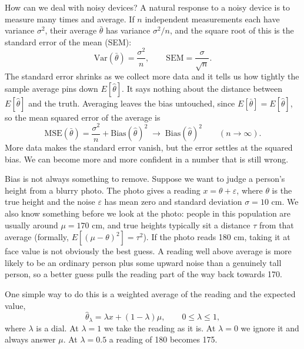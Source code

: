 \documentclass{article}
\begin{document}
How can we deal with noisy devices? A natural response to a noisy device is to measure many times and average. If $n$ independent measurements each have variance $\sigma^2$, their average $\bar{\theta}$ has variance $\sigma^2/n$, and the square root of this is the standard error of the mean (SEM):
\begin{equation*}
	\mathrm{Var}(\bar{\theta}) = \frac{\sigma^2}{n}, \qquad \mathrm{SEM} = \frac{\sigma}{\sqrt{n}} .
\end{equation*}
The standard error shrinks as we collect more data and it tells us how tightly the sample average pins down $E[\hat{\theta}]$. It says nothing about the distance between $E[\hat{\theta}]$ and the truth. Averaging leaves the bias untouched, since $E[\bar{\theta}] = E[\hat{\theta}]$, so the mean squared error of the average is
\begin{equation*}
	\mathrm{MSE}(\bar{\theta}) = \frac{\sigma^2}{n} + \mathrm{Bias}(\hat{\theta})^2
	\;\longrightarrow\; \mathrm{Bias}(\hat{\theta})^2 \qquad (n \to \infty).
\end{equation*}
More data makes the standard error vanish, but the error settles at the squared bias. We can become more and more confident in a number that is still wrong. 

Bias is not always something to remove. Suppose we want to judge a person's height from a blurry photo. The photo gives a reading $x = \theta + \varepsilon$, where $\theta$ is the true height and the noise $\varepsilon$ has mean zero and standard deviation $\sigma = 10$ cm. We also know something before we look at the photo: people in this population are usually around $\mu = 170$ cm, and true heights typically sit a distance $\tau$ from that average (formally, $E[(\mu-\theta)^2]=\tau^2$). If the photo reads 180 cm, taking it at face value is not obviously the best guess. A reading well above average is more likely to be an ordinary person plus some upward noise than a genuinely tall person, so a better guess pulls the reading part of the way back towards 170.

One simple way to do this is a weighted average of the reading and the expected value,
\begin{equation*}
	\hat{\theta}_\lambda = \lambda x + (1-\lambda)\mu, \qquad 0 \le \lambda \le 1 ,
\end{equation*}
where $\lambda$ is a dial. At $\lambda = 1$ we take the reading as it is. At $\lambda = 0$ we ignore it and always answer $\mu$. At $\lambda = 0.5$ a reading of 180 becomes 175.
\end{document}
